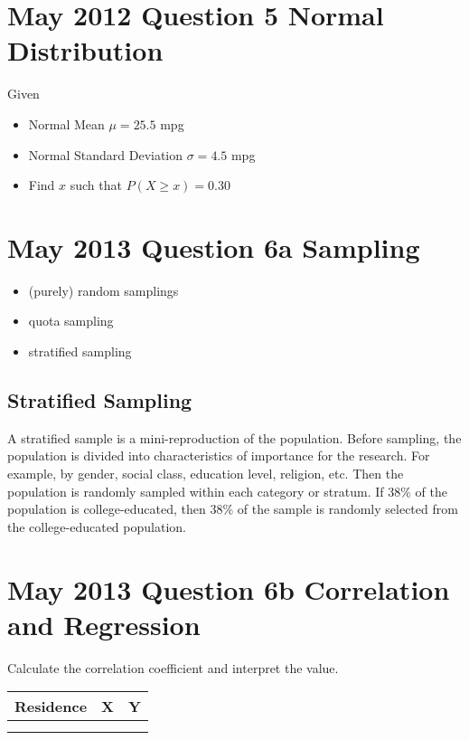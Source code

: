 \documentclass[12pts]{article}
\begin{document}
\section*{May 2012 Question 5 Normal Distribution }
Given
\begin{itemize}
\item Normal Mean $\mu =25.5$ mpg
\item Normal Standard Deviation $\sigma =4.5$ mpg
\end{itemize}
\begin{itemize}
\item Find $x$ such that $P(X \geq x) = 0.30$
\end{itemize}

\section*{May 2013 Question 6a Sampling }

\begin{itemize}
\item (purely) random samplings
\item quota sampling
\item stratified sampling
\end{itemize}

\subsection*{Stratified Sampling}
A stratified sample is a mini-reproduction of the population. Before sampling, the population is divided into characteristics of importance for the research. For example, by gender, social class, education level, religion, etc. Then the population is randomly sampled within each category or stratum. If 38\% of the population is college-educated, then 38\% of the sample is randomly selected from the college-educated population.
\section*{May 2013 Question 6b Correlation and Regression }
Calculate the correlation coefficient and interpret the value.
\begin{tabular}{|c|c|c|}
\hline Residence	& X	  & Y \\ 
\hline  &  &  \\ 
\hline  &  &  \\ 
\hline 
\end{tabular} 
\newpage
\end{document}
